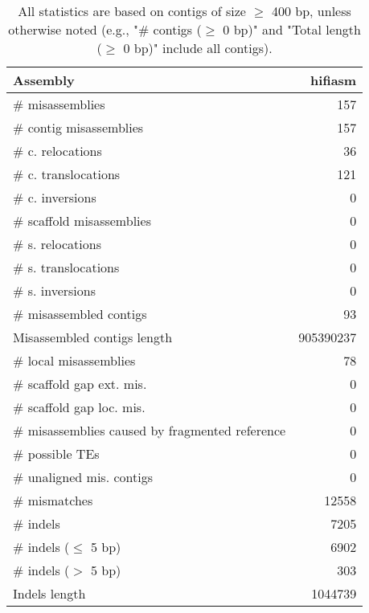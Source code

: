 \documentclass[12pt,a4paper]{article}
\begin{document}
\begin{table}[ht]
\begin{center}
\caption{All statistics are based on contigs of size $\geq$ 400 bp, unless otherwise noted (e.g., "\# contigs ($\geq$ 0 bp)" and "Total length ($\geq$ 0 bp)" include all contigs).}
\begin{tabular}{|l*{1}{|r}|}
\hline
Assembly & hifiasm \\ \hline
\# misassemblies & 157 \\ \hline
\hspace{2mm}\# contig misassemblies & 157 \\ \hline
\hspace{5mm}\# c. relocations & 36 \\ \hline
\hspace{5mm}\# c. translocations & 121 \\ \hline
\hspace{5mm}\# c. inversions & 0 \\ \hline
\hspace{2mm}\# scaffold misassemblies & 0 \\ \hline
\hspace{5mm}\# s. relocations & 0 \\ \hline
\hspace{5mm}\# s. translocations & 0 \\ \hline
\hspace{5mm}\# s. inversions & 0 \\ \hline
\# misassembled contigs & 93 \\ \hline
Misassembled contigs length & 905390237 \\ \hline
\# local misassemblies & 78 \\ \hline
\# scaffold gap ext. mis. & 0 \\ \hline
\# scaffold gap loc. mis. & 0 \\ \hline
\# misassemblies caused by fragmented reference & 0 \\ \hline
\# possible TEs & 0 \\ \hline
\# unaligned mis. contigs & 0 \\ \hline
\# mismatches & 12558 \\ \hline
\# indels & 7205 \\ \hline
\hspace{5mm}\# indels ($\leq$ 5 bp) & 6902 \\ \hline
\hspace{5mm}\# indels ($>$ 5 bp) & 303 \\ \hline
Indels length & 1044739 \\ \hline
\end{tabular}
\end{center}
\end{table}
\end{document}
